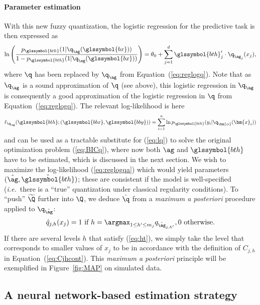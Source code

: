 \paragraph{Parameter estimation}

With this new fuzzy quantization, the logistic regression for the predictive task is then expressed as
\begin{equation}
    \label{eq:reglogqa}
    \ln \left( \dfrac{p_{\glssymbol{bth}}(1|\q_{\ag} (\glssymbol{bx}))}{1 - p_{\glssymbol{bth}}(1|\q_{\ag} (\glssymbol{bx}))} \right) = \theta_0 + \sum_{j=1}^d {\glssymbol{bth}_j' \cdot \q_{\ag_{j}}(x_j)},
\end{equation}
where $\q$ has been replaced by $\q_{\ag}$ from Equation~(\ref{eq:reglogq}).
Note that as $\q_{\ag}$ is a sound approximation of $\q$ (see above), this logistic regression in $\q_{\ag}$ is consequently a good approximation of the logistic regression in $\q$ from Equation~(\ref{eq:reglogq}). The relevant log-likelihood is here 
\begin{equation}
    \label{eq:lqa}
    \ell_{\q_{\ag}}(\glssymbol{bth} ; (\glssymbol{bbx},\glssymbol{bby}))=\sum_{i=1}^n \ln p_{\glssymbol{bth}}(y_i|\q_{\bm{\alpha}}(\bm{x}_i))
\end{equation}
and can be used as a tractable substitute for (\ref{eq:lq}) to solve the original optimization problem (\ref{eq:BICq}), where now both $\ag$ and $\glssymbol{bth}$ have to be estimated, which is discussed in the next section. We wish to maximize the log-likelihood (\ref{eq:reglogqa}) which would yield parameters $(\hat{\ag},\hat{\glssymbol{bth}})$; these are consistent if the model is well-specified (\textit{i.e.}\ there is a ``true'' quantization under classical regularity conditions). To ``push'' $\widetilde{\Q}$ further into $\Q$, we deduce $\hat{\q}$ from a \textit{maximum a posteriori} procedure applied to $\q_{\hat{\ag}}$:
\begin{equation}
    \label{eq:ht}
    \hat{q}_{j,h}(x_j) = 1 \text{ if } h = \argmax_{1 \leq h' \leq m_j} q_{\hat{\ag}_{j,h'}}, 0 \text{ otherwise.}
\end{equation}
If there are several levels $h$ that satisfy (\ref{eq:ht}), we simply take the level that corresponds to smaller values of $x_j$ to be in accordance with the definition of $C_{j,h}$ in Equation~(\ref{eq:Cjhcont}). This {\it maximum a posteriori} principle will be exemplified in Figure~\ref{fig:MAP} on simulated data.


\subsection{A neural network-based estimation strategy} \label{sec:estim}


